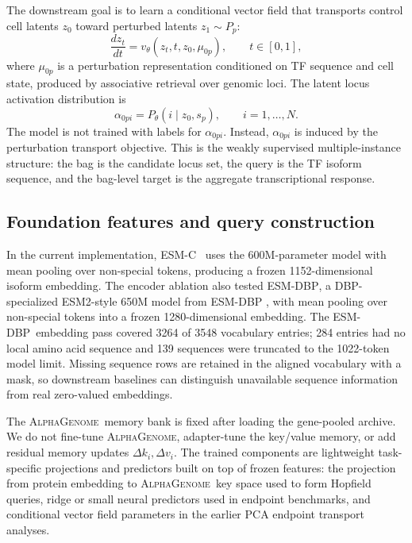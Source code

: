 \documentclass{article}
\newcommand{\ag}{\textsc{AlphaGenome}}
\newcommand{\esm}{\textsc{ESM-C}}
\newcommand{\esmdbp}{\textsc{ESM-DBP}}
\begin{document}
The downstream goal is to learn a conditional vector field that transports control cell latents \(z_0\) toward perturbed latents \(z_1 \sim P_p\):
\begin{equation}
    \frac{d z_t}{dt} = v_\theta(z_t, t, z_0, \mu_{0p}), \qquad t \in [0,1],
\end{equation}
where \(\mu_{0p}\) is a perturbation representation conditioned on TF sequence and cell state, produced by associative retrieval over genomic loci. The latent locus activation distribution is
\begin{equation}
    \alpha_{0pi} = P_\theta(i \mid z_0, s_p), \qquad i = 1,\ldots,N.
\end{equation}
The model is not trained with labels for \(\alpha_{0pi}\). Instead, \(\alpha_{0pi}\) is induced by the perturbation transport objective. This is the weakly supervised multiple-instance structure: the bag is the candidate locus set, the query is the TF isoform sequence, and the bag-level target is the aggregate transcriptional response.

\subsection{Foundation features and query construction}

In the current implementation, \esm\ \citep{evolutionaryscale2024} uses the 600M-parameter model with mean pooling over non-special tokens, producing a frozen 1152-dimensional isoform embedding. The encoder ablation also tested \esmdbp, a DBP-specialized ESM2-style 650M model from ESM-DBP \citep{zeng2024esmdbp}, with mean pooling over non-special tokens into a frozen 1280-dimensional embedding. The \esmdbp\ embedding pass covered 3264 of 3548 vocabulary entries; 284 entries had no local amino acid sequence and 139 sequences were truncated to the 1022-token model limit. Missing sequence rows are retained in the aligned vocabulary with a mask, so downstream baselines can distinguish unavailable sequence information from real zero-valued embeddings.

The \ag\ memory bank is fixed after loading the gene-pooled archive. We do not fine-tune \ag, adapter-tune the key/value memory, or add residual memory updates \(\Delta k_i,\Delta v_i\). The trained components are lightweight task-specific projections and predictors built on top of frozen features: the projection from protein embedding to \ag\ key space used to form Hopfield queries, ridge or small neural predictors used in endpoint benchmarks, and conditional vector field parameters in the earlier PCA endpoint transport analyses.
\end{document}
